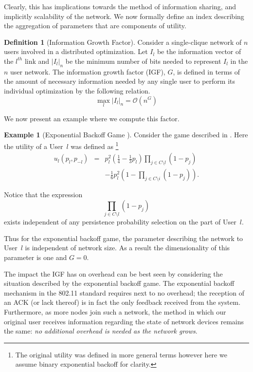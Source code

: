 \documentclass[11pt]{IEEEtran}
\theoremstyle{definition}
\newtheorem{definition}{Definition}
\newtheorem{example}{Example}
\begin{document}
Clearly, this has implications towards the method of information sharing, and implicitly scalability of the network. We now formally define an index describing the aggregation of parameters that are components of utility.
\begin{definition}[Information Growth Factor]
	Consider a single-clique network of $n$ users involved in a distributed optimization. Let $I_l$ be the information vector of the $l^{th}$ link and $| I_l |_n$ be the minimum number of bits needed to represent $I_l$ in the $n$ user network. The information growth factor (IGF), $G$, is defined in terms of the amount of necessary information needed by any single user to perform its individual optimization by the following relation.
	\begin{equation}
		\max_l |I_l|_n = \mathcal{O}(n^G) 
	\end{equation}
\end{definition}

We now present an example where we compute this factor. 
\begin{example}[Exponential Backoff Game \cite{LTHCC07}] 
Consider the game described in \cite{LTHCC07}. Here the utility of a User~$l$ was defined as \footnote{The original utility was defined in more general terms however here we assume binary exponential backoff for clarity.}
\begin{align}
	u_l(p_l,p_{-l}) &=& p_l^2\left(\frac{1}{4} - \frac{1}{3}p_l\right)\prod_{j \in C\setminus l}(1-p_j)\nonumber \\
	& & -\frac{1}{6}p_l^2\left(1 - \prod_{j \in C\setminus i}(1-p_j)\right).
	\label{eq:rem}
\end{align}

Notice that the expression
\begin{equation}
	\prod_{j \in C\setminus l}(1-p_j)
\end{equation}
exists independent of any persistence probability selection on the part of User~$l$.

Thus for the exponential backoff game, the parameter describing the network to User~$l$ is independent of network size. As a result the dimensionality of this parameter is one and $G = 0$.
\end{example}

The impact the IGF has on overhead can be best seen by considering the situation described by the exponential backoff game. The exponential backoff mechanism in the 802.11 standard requires next to no overhead; the reception of an ACK (or lack thereof) is in fact the only feedback received from the system. Furthermore, as more nodes join such a network, the method in which our original user receives information regarding the state of network devices remains the same: {\em no additional overhead is needed as the network grows}. 
\end{document}
